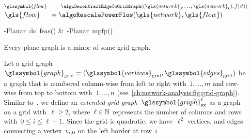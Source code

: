 \begin{algorithm}[tb!]
\label{ch:network-analyzes:algo:stpf:flowAssignment}%
\;
% 
$
    \glssymbol{flow}
    \hspace{5mm}=
    \algoDecontractEdgeToGridGraph((\gls{network}_0,\dots,\gls{network}_k),\flow(\edge'))
$
\label{ch:network-analyzes:algo:stpf:decontractGridGraphToEdge}%
\;
% 
$
    \gls{flow} 
    \hspace{5mm}= 
    \algoRescalePowerFlow(\gls{network},\gls{flow})$%
\label{ch:network-analyzes:algo:stpf:rescaling}%
%
% 
\Return~\;
%
%
\caption{\source-\sink Planar~\gls{dc}~\gls{feas}()
 \&~\source-\sink Planar~\gls{mpfp}()}
\label{ch:network-analyzes:algo:s-t-power-flow-transformation-algorithm}%
\end{algorithm}%
% 
\begin{lemma}
    Every plane graph is a minor of some grid graph.
    \label{ch:network-analyzes:sec:mathematical-model:lem:plane-graph-grid-graphs}
\end{lemma}
% 
Let a grid graph~$
    \glssymbol{graph}_{\mathrm{grid}} 
    = 
    (
    \glssymbol{vertices}_{\mathrm{grid}},
    \glssymbol{edges}_{\mathrm{grid}}
    )
$ be a graph that is numbered column-wise from left to right with~$1, \dots, m$
and row-wise from top to bottom with~$1, \dots, n$
(see~\cref{ch:network-analysis:fig:grid-graph}).
% 
Similar to~\textcite{Tru89}, we define an \emph{extended grid graph}~$
\glssymbol{graph}_{\mathrm{ex}}^\ell$ as a graph on a grid with~$\ell \geq 2$, 
where~$\ell \in \mathbb{N}$ represents the number of columns and rows with~$0
\leq i \leq \ell-1$. Since the grid is quadratic, we have~$\ell^2$ vertices, and
edges connecting a vertex~$v_{i,0}$ on the left border at row~$i$
% 

